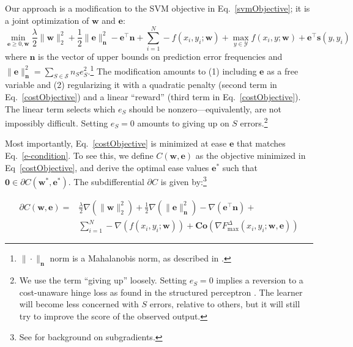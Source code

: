 \documentclass{article} %
\begin{document}
Our approach is a modification to the SVM objective in
Eq.~\ref{svmObjective}; it is a joint optimization of $\mathbf{w}$ and $\mathbf{e}$:
\begin{equation}
\label{costObjective}
\min_{\mathbf{e}\geq 0,\mathbf{w}} \frac{\lambda}{2}\|\mathbf{w}\|_2^2
+ \frac{1}{2} \|\mathbf{e}\|_{\mathbf{n}}^2 - \mathbf{e}^\top
\mathbf{n} + \sum_{i=1}^N -f(x_i,y_i; \mathbf{w})  + \max_{y \in
  \mathcal{Y}} f(x_i,y ; \mathbf{w}) + \mathbf{e}^\top \mathbf{s}(y, y_i)
\end{equation}
where $\mathbf{n}$ is the vector of upper bounds on prediction error
frequencies and 
$\|\mathbf{e}\|_{\mathbf{n}}^2 = \sum_{S \in
  \mathcal{S}} n_Se_S^2$.\footnote{$\|\cdot\|_{\mathbf{n}}$ norm is
  a Mahalanobis norm, as described in
  \citep{mahalanobis1936generalized}.} 
 The modification amounts to (1) including
$\mathbf{e}$ as a free variable and (2) regularizing it with a quadratic
penalty (second term in Eq.~\ref{costObjective}) and a linear ``reward''
(third term in Eq.~\ref{costObjective}).  The linear term selects
which $e_S$ should be nonzero---equivalently, are not impossibly
difficult. Setting $e_S=0$ amounts to giving up on $S$
errors.\footnote{We use the term ``giving up'' loosely.  Setting
  $e_S=0$ implies a reversion to a cost-unaware hinge loss as found in
  the structured perceptron \citep{collins2002discriminative}.  The
  learner will become less concerned with $S$ errors, relative to
  others, but it will still try to improve the score of the observed output.}

Most importantly, Eq.~\ref{costObjective} is minimized at ease
 $\mathbf{e}$ 
that matches Eq.~\ref{e-condition}.  To see this, we define 
$C(\mathbf{w},\mathbf{e})$ as the objective minimized in 
Eq~\ref{costObjective}, and derive the optimal ease 
values $\mathbf{e}^*$
such that $\mathbf{0}\in \partial C(\mathbf{w}^*,\mathbf{e}^*)$.  
The subdifferential $\partial C$ is given by:\footnote{See
  \citep{subgradients} for background on subgradients.}

\begin{equation}
\label{subdifferential}
\begin{split}
\partial C(\mathbf{w},\mathbf{e}) = & \frac{\lambda}{2}\nabla (\|\mathbf{w}\|_2^2)
+\frac{1}{2}\nabla (\|\mathbf{e}\|^2_{\mathbf{n}})-\nabla (\mathbf{e}^\top \mathbf{n})
+ \\ 
& \sum_{i=1}^N -\nabla (f(x_i,y_i; \mathbf{w}))+ 
\mathbf{Co}(\nabla F^{\Delta}_{\max}(x_i,y_i;\mathbf{w},\mathbf{e}))
\end{split}
\end{equation}
\end{document}
